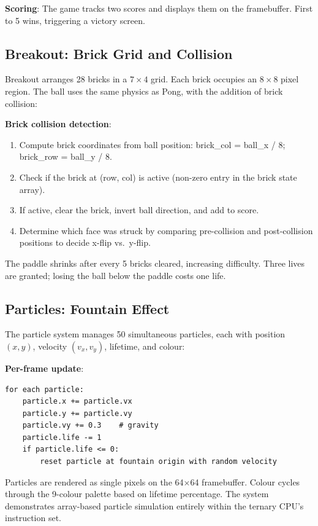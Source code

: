 \documentclass[12pt,a4paper,twoside]{book}
\theoremstyle{trinarytheorem}
\theoremstyle{trinarydefinition}
\newcommand{\code}[1]{\textsf{#1}}
\begin{document}
\noindent\textbf{Scoring}: The game tracks two scores and displays them
on the framebuffer. First to 5 wins, triggering a victory screen.

\subsection{Breakout: Brick Grid and Collision}

Breakout arranges 28 bricks in a $7 \times 4$ grid. Each brick occupies
an $8 \times 8$ pixel region. The ball uses the same physics as Pong,
with the addition of brick collision:

\noindent\textbf{Brick collision detection}:
\begin{enumerate}
    \item Compute brick coordinates from ball position:
          \code{brick\_col = ball\_x / 8; brick\_row = ball\_y / 8}.
    \item Check if the brick at \code{(row, col)} is active (non-zero
          entry in the brick state array).
    \item If active, clear the brick, invert ball direction, and add to
          score.
    \item Determine which face was struck by comparing pre-collision
          and post-collision positions to decide x-flip vs.\ y-flip.
\end{enumerate}

The paddle shrinks after every 5 bricks cleared, increasing difficulty.
Three lives are granted; losing the ball below the paddle costs one life.

\subsection{Particles: Fountain Effect}

The particle system manages 50 simultaneous particles, each with position
$(x,y)$, velocity $(v_x,v_y)$, lifetime, and colour:

\noindent\textbf{Per-frame update}:
\begin{verbatim}
for each particle:
    particle.x += particle.vx
    particle.y += particle.vy
    particle.vy += 0.3    # gravity
    particle.life -= 1
    if particle.life <= 0:
        reset particle at fountain origin with random velocity
\end{verbatim}

Particles are rendered as single pixels on the 64$\times$64 framebuffer.
Colour cycles through the 9-colour palette based on lifetime percentage.
The system demonstrates array-based particle simulation entirely within
the ternary CPU's instruction set.
\end{document}
